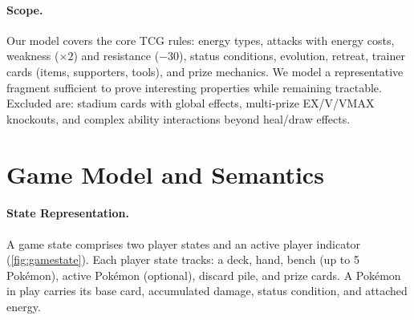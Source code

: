\documentclass[a4paper,UKenglish,cleveref,autoref,anonymous]{lipics-v2021}
\begin{document}
\paragraph{Scope.}
Our model covers the core TCG rules: energy types, attacks with energy costs, weakness ($\times 2$) and resistance ($-30$), status conditions, evolution, retreat, trainer cards (items, supporters, tools), and prize mechanics.
We model a representative fragment sufficient to prove interesting properties while remaining tractable.
Excluded are: stadium cards with global effects, multi-prize EX/V/VMAX knockouts, and complex ability interactions beyond heal/draw effects.

\section{Game Model and Semantics}
\label{sec:semantics}

\paragraph{State Representation.}
A game state comprises two player states and an active player indicator (\cref{fig:gamestate}).
Each player state tracks: a deck, hand, bench (up to 5 Pok\'emon), active Pok\'emon (optional), discard pile, and prize cards.
A Pok\'emon in play carries its base card, accumulated damage, status condition, and attached energy.
\end{document}
